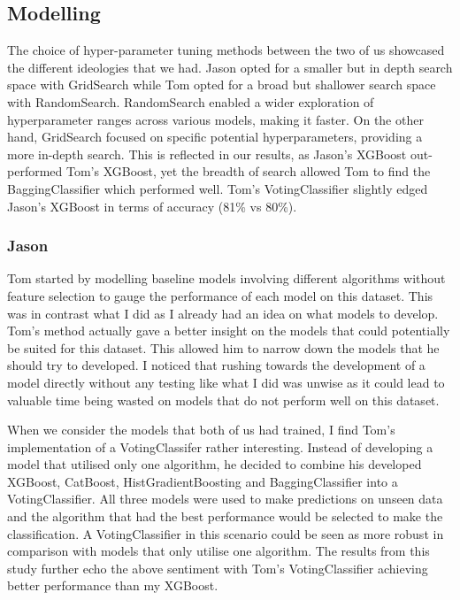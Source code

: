 \documentclass[conference]{IEEEtran}
\begin{document}
\subsection{Modelling}

The choice of hyper-parameter tuning methods between the two of us showcased the different ideologies that we had. Jason opted for a smaller but in depth search space with GridSearch while Tom opted for a broad but shallower search space with RandomSearch. RandomSearch enabled a wider exploration of hyperparameter ranges across various models, making it faster. On the other hand, GridSearch focused on specific potential hyperparameters, providing a more in-depth search. This is reflected in our results, as Jason's XGBoost out-performed Tom's XGBoost, yet the breadth of search allowed Tom to find the BaggingClassifier which performed well. Tom's VotingClassifier slightly edged Jason's XGBoost in terms of accuracy (81\% vs 80\%).


\subsubsection{Jason}

Tom started by modelling baseline models involving different algorithms without feature selection to gauge the performance of each model on this dataset. This was in contrast what I did as I already had an idea on what models to develop. Tom's method actually gave a better insight on the models that could potentially be suited for this dataset. This allowed him to narrow down the models that he should try to developed. I noticed that rushing towards the development of a model directly without any testing like what I did was unwise as it could lead to valuable time being wasted on models that do not perform well on this dataset.

When we consider the models that both of us had trained, I find Tom's implementation of a VotingClassifer rather interesting. Instead of developing a model that utilised only one algorithm, he decided to combine his developed XGBoost, CatBoost, HistGradientBoosting and BaggingClassifier into a VotingClassifier. All three models were used to make predictions on unseen data and the algorithm that had the best performance would be selected to make the classification. A VotingClassifier in this scenario could be seen as more robust in comparison with models that only  utilise one algorithm. The results from this study further echo the above sentiment with Tom's VotingClassifier achieving better performance than my XGBoost.
\end{document}
